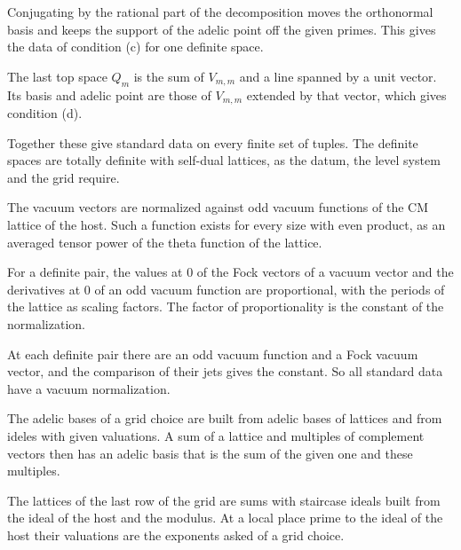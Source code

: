 Conjugating by the rational part of the decomposition moves the orthonormal basis and keeps the support of the adelic
point off the given primes. This gives the data of condition (c) for one definite space.

The last top space $Q_m$ is the sum of $V_{m,m}$ and a line spanned by a unit vector. Its basis and adelic point are
those of $V_{m,m}$ extended by that vector, which gives condition (d).

Together these give standard data on every finite set of tuples. The definite spaces are totally definite with
self-dual lattices, as the datum, the level system and the grid require.

The vacuum vectors are normalized against odd vacuum functions of the CM lattice of the host. Such a function exists
for every size with even product, as an averaged tensor power of the theta function of the lattice.

For a definite pair, the values at $0$ of the Fock vectors of a vacuum vector and the derivatives at $0$ of an odd
vacuum function are proportional, with the periods of the lattice as scaling factors. The factor of proportionality is
the constant of the normalization.

At each definite pair there are an odd vacuum function and a Fock vacuum vector, and the comparison of their jets
gives the constant. So all standard data have a vacuum normalization.

The adelic bases of a grid choice are built from adelic bases of lattices and from ideles with given valuations. A sum
of a lattice and multiples of complement vectors then has an adelic basis that is the sum of the given one and these
multiples.

The lattices of the last row of the grid are sums with staircase ideals built from the ideal of the host and the
modulus. At a local place prime to the ideal of the host their valuations are the exponents asked of a grid choice.

